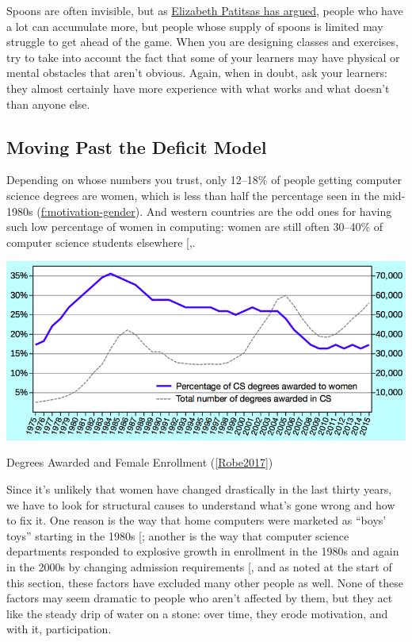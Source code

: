 Spoons are often invisible, but as \href{https://patitsas.blogspot.com/2018/03/spoons-are-form-of-capital.html}{Elizabeth Patitsas has
argued}, people who have a lot can accumulate more,
but people whose supply of spoons is limited may struggle to get ahead
of the game. When you are designing classes and exercises, try to take
into account the fact that some of your learners may have physical or
mental obstacles that aren't obvious. Again, when in doubt, ask your
learners: they almost certainly have more experience with what works
and what doesn't than anyone else.

\subsection{Moving Past the Deficit Model}\label{s:motivation-deficit}

Depending on whose numbers you trust, only 12--18\% of people getting
computer science degrees are women, which is less than half the
percentage seen in the mid-1980s (\protect\hyperlink{FIGURE}{f:motivation-gender}). And
western countries are the odd ones for having such low percentage of
women in computing: women are still often 30--40\% of computer science
students elsewhere {[},\protect[\hyperlink{b:Varm2015}{Varm2015}]{]}.

\includegraphics{../../files/enrollment.png}

Degrees Awarded and Female Enrollment ({[}\protect\hyperlink{Robe2017}{Robe2017}{]})

Since it's unlikely that women have changed drastically in the last
thirty years, we have to look for structural causes to understand what's
gone wrong and how to fix it. One reason is the way that home computers
were marketed as ``boys' toys'' starting in the 1980s {[}\protect[\hyperlink{b:Marg2003}{Marg2003}]{]};
another is the way that computer science departments responded to
explosive growth in enrollment in the 1980s and again in the 2000s by
changing admission requirements {[}\protect[\hyperlink{b:Robe2017}{Robe2017}]{]}, and as noted at the
start of this section, these factors have excluded many other people as
well. None of these factors may seem dramatic to people who aren't
affected by them, but they act like the steady drip of water on a stone:
over time, they erode motivation, and with it, participation.

